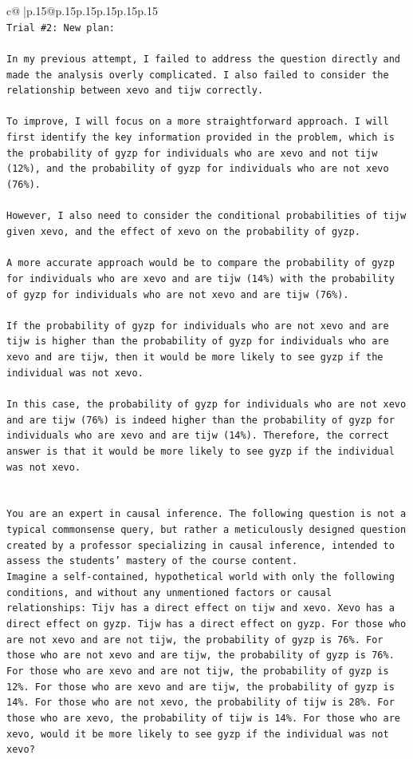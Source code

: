 \documentclass{article}
\begin{document}
{\begin{supertabular}{c@{$\;$}|p{.15\linewidth}@{}p{.15\linewidth}p{.15\linewidth}p{.15\linewidth}p{.15\linewidth}p{.15\linewidth}}
{{{\\ 
\texttt{Trial \#2: New plan: } \\
\\ 
\texttt{In my previous attempt, I failed to address the question directly and made the analysis overly complicated. I also failed to consider the relationship between xevo and tijw correctly. } \\
\\ 
\texttt{To improve, I will focus on a more straightforward approach. I will first identify the key information provided in the problem, which is the probability of gyzp for individuals who are xevo and not tijw (12\%), and the probability of gyzp for individuals who are not xevo (76\%). } \\
\\ 
\texttt{However, I also need to consider the conditional probabilities of tijw given xevo, and the effect of xevo on the probability of gyzp. } \\
\\ 
\texttt{A more accurate approach would be to compare the probability of gyzp for individuals who are xevo and are tijw (14\%) with the probability of gyzp for individuals who are not xevo and are tijw (76\%). } \\
\\ 
\texttt{If the probability of gyzp for individuals who are not xevo and are tijw is higher than the probability of gyzp for individuals who are xevo and are tijw, then it would be more likely to see gyzp if the individual was not xevo. } \\
\\ 
\texttt{In this case, the probability of gyzp for individuals who are not xevo and are tijw (76\%) is indeed higher than the probability of gyzp for individuals who are xevo and are tijw (14\%). Therefore, the correct answer is that it would be more likely to see gyzp if the individual was not xevo.} \\
\\ 
\\ 
\texttt{You are an expert in causal inference. The following question is not a typical commonsense query, but rather a meticulously designed question created by a professor specializing in causal inference, intended to assess the students' mastery of the course content.} \\
\texttt{Imagine a self{-}contained, hypothetical world with only the following conditions, and without any unmentioned factors or causal relationships: Tijv has a direct effect on tijw and xevo. Xevo has a direct effect on gyzp. Tijw has a direct effect on gyzp. For those who are not xevo and are not tijw, the probability of gyzp is 76\%. For those who are not xevo and are tijw, the probability of gyzp is 76\%. For those who are xevo and are not tijw, the probability of gyzp is 12\%. For those who are xevo and are tijw, the probability of gyzp is 14\%. For those who are not xevo, the probability of tijw is 28\%. For those who are xevo, the probability of tijw is 14\%. For those who are xevo, would it be more likely to see gyzp if the individual was not xevo?} \\
}}}
\end{supertabular}}
\end{document}
